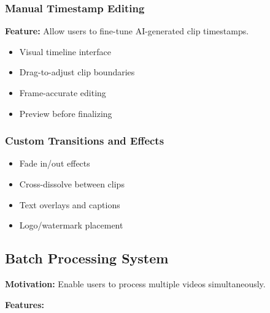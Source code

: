 \subsubsection{Manual Timestamp Editing}

\textbf{Feature:} Allow users to fine-tune AI-generated clip timestamps.

\begin{itemize}
    \item Visual timeline interface
    \item Drag-to-adjust clip boundaries
    \item Frame-accurate editing
    \item Preview before finalizing
\end{itemize}

\subsubsection{Custom Transitions and Effects}

\begin{itemize}
    \item Fade in/out effects
    \item Cross-dissolve between clips
    \item Text overlays and captions
    \item Logo/watermark placement
\end{itemize}

\subsection{Batch Processing System}

\textbf{Motivation:} Enable users to process multiple videos simultaneously.

\textbf{Features:}

